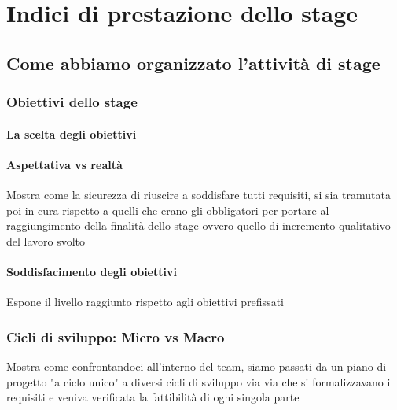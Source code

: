 
\chapter{Indici di prestazione dello stage}
\label{cap:performance-stage}

\section{Come abbiamo organizzato l'attività di stage}
\subsection{Obiettivi dello stage}
\subsubsection{La scelta degli obiettivi}
\subsubsection{Aspettativa vs realtà}
Mostra come la sicurezza di riuscire a soddisfare tutti requisiti, si sia tramutata poi in cura rispetto a quelli che erano gli obbligatori per portare al raggiungimento della finalità dello stage ovvero quello di incremento qualitativo del lavoro svolto
\subsubsection{Soddisfacimento degli obiettivi}
Espone il livello raggiunto rispetto agli obiettivi prefissati
\subsection{Cicli di sviluppo: Micro vs Macro}
Mostra come confrontandoci all'interno del team, siamo passati da un piano di progetto "a ciclo unico" a diversi cicli di sviluppo via via che si formalizzavano i requisiti e veniva verificata la fattibilità di ogni singola parte
